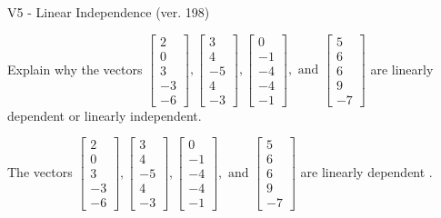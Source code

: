 \begin{exercise}
  \begin{exerciseTitle}V5 - Linear Independence (ver. 198)\end{exerciseTitle}
  \begin{exerciseStatement}
    Explain why the vectors \(\left[\begin{array}{r}
2 \\
0 \\
3 \\
-3 \\
-6
\end{array}\right] , \left[\begin{array}{r}
3 \\
4 \\
-5 \\
4 \\
-3
\end{array}\right] , \left[\begin{array}{r}
0 \\
-1 \\
-4 \\
-4 \\
-1
\end{array}\right] , \text{ and } \left[\begin{array}{r}
5 \\
6 \\
6 \\
9 \\
-7
\end{array}\right]\) are linearly dependent or linearly independent.	


  \end{exerciseStatement}
  \begin{exerciseAnswer}
   The vectors \(\left[\begin{array}{r}
2 \\
0 \\
3 \\
-3 \\
-6
\end{array}\right] , \left[\begin{array}{r}
3 \\
4 \\
-5 \\
4 \\
-3
\end{array}\right] , \left[\begin{array}{r}
0 \\
-1 \\
-4 \\
-4 \\
-1
\end{array}\right] , \text{ and } \left[\begin{array}{r}
5 \\
6 \\
6 \\
9 \\
-7
\end{array}\right]\) are 
  	 linearly dependent  .
  


  \end{exerciseAnswer}
\end{exercise}
